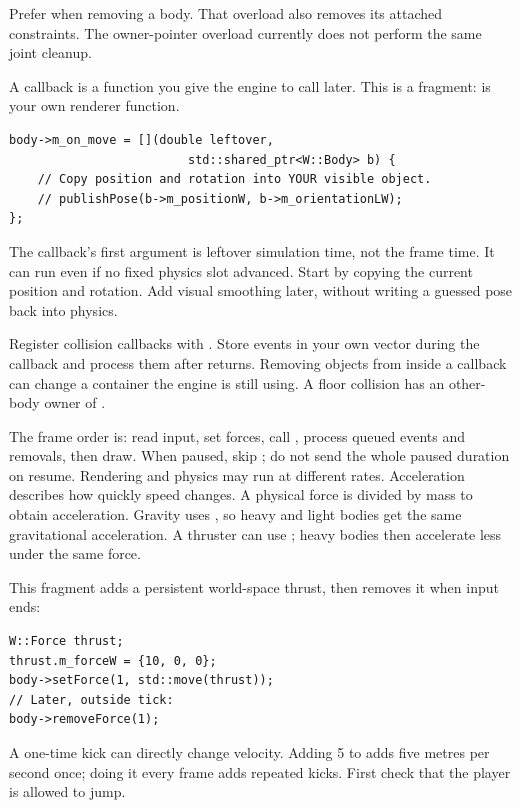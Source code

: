\documentclass[11pt,a4paper]{article}
\begin{document}
\begin{remember}Prefer  when removing a body. That overload also removes its attached constraints. The owner-pointer overload currently does not perform the same joint cleanup.\end{remember}
A callback is a function you give the engine to call later. This is a fragment:  is your own renderer function.\begin{lstlisting}
body->m_on_move = [](double leftover,
                         std::shared_ptr<W::Body> b) {
    // Copy position and rotation into YOUR visible object.
    // publishPose(b->m_positionW, b->m_orientationLW);
};
\end{lstlisting}
The callback's first argument is leftover simulation time, not the frame time. It can run even if no fixed physics slot advanced. Start by copying the current position and rotation. Add visual smoothing later, without writing a guessed pose back into physics.

Register collision callbacks with . Store events in your own vector during the callback and process them after  returns. Removing objects from inside a callback can change a container the engine is still using. A floor collision has an other-body owner of .

The frame order is: read input, set forces, call , process queued events and removals, then draw. When paused, skip ; do not send the whole paused duration on resume. Rendering and physics may run at different rates.
Acceleration describes how quickly speed changes. A physical force is divided by mass to obtain acceleration. Gravity uses , so heavy and light bodies get the same gravitational acceleration. A thruster can use ; heavy bodies then accelerate less under the same force.

This fragment adds a persistent world-space thrust, then removes it when input ends:\begin{lstlisting}
W::Force thrust;
thrust.m_forceW = {10, 0, 0};
body->setForce(1, std::move(thrust));
// Later, outside tick:
body->removeForce(1);
\end{lstlisting}
A one-time kick can directly change velocity. Adding 5 to  adds five metres per second once; doing it every frame adds repeated kicks. First check that the player is allowed to jump.
\end{document}
